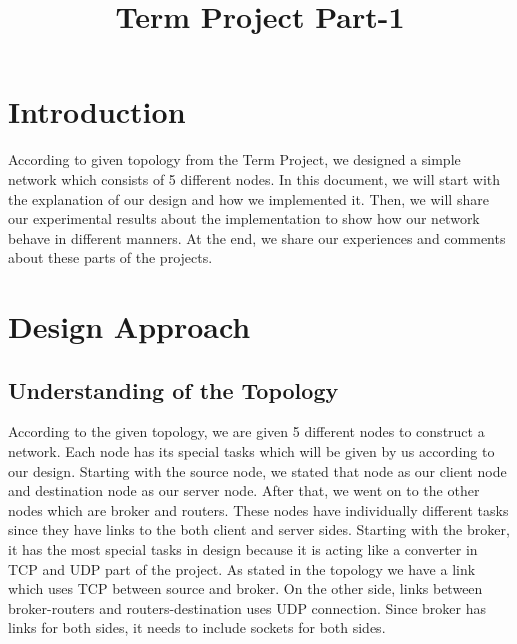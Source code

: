 \documentclass[conference]{IEEEtran}
\begin{document}
\title{Term Project Part-1\\
{\footnotesize }
}

\author{
\and
{}
}

\maketitle


\section{Introduction}
According to given topology from the Term Project, we designed a simple network which consists of 5 different nodes. In this document, we will start with the explanation of our design and how we implemented it. Then, we will share our experimental results about the implementation to show how our network behave in different manners. At the end, we share our experiences and comments about these parts of the projects.

\section{Design Approach}

\subsection{Understanding of the Topology}

According to the given topology, we are given 5 different nodes to construct a network. Each node has its special tasks which will be given by us according to our design. Starting with the source node, we stated that node as our client node and destination node as our server node. After that, we went on to the other nodes which are broker and routers. These nodes have individually different tasks since they have links to the both client and server sides. Starting with the broker, it has the most special tasks in design because it is acting like a converter in TCP and UDP part of the project. As stated in the topology we have a link which uses TCP between source and broker. On the other side, links between broker-routers and routers-destination uses UDP connection. Since broker has links for both sides, it needs to include sockets for both sides.
\end{document}
